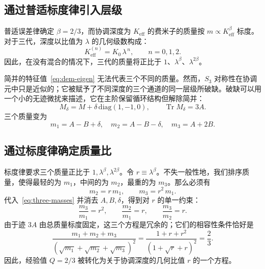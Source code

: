 \documentclass[11pt,a4paper]{article}
\theoremstyle{remark}
\begin{document}
	\subsection{通过普适标度律引入层级}
	
	普适误差律确定 \(\beta = 2/3\)，而协调深度为 \(K_{\mathrm{eff}}\) 的费米子的质量按 \(m \propto K_{\mathrm{eff}}^{\beta}\) 标度。对于三代，深度以比值为 \(\lambda\) 的几何级数构成：
	\[
	K_{\mathrm{eff}}^{(n)} = K_0 \, \lambda^{\,n}, \qquad n = 0,1,2 .
	\]
	因此，在没有混合的情况下，三代的质量将正比于 \(1\)、\(\lambda^{\beta}\)、\(\lambda^{2\beta}\)。
	
	简并的特征值~\eqref{eq:dem-eigen} 无法代表三个不同的质量。然而，\(S_3\) 对称性在协调元中只是近似的；它被赋予了不同深度的三个通道的同一层级所破缺。破缺可以用一个小的无迹微扰来描述，它在主阶保留循环结构但解除简并：
	\begin{equation}
		M_\delta = M + \delta \,\mathrm{diag}(1,-1,0), \qquad \operatorname{Tr} M_\delta = 3A .
	\end{equation}
	三个质量变为
	\begin{equation}
		m_1 = A - B + \delta, \quad
		m_2 = A - B - \delta, \quad
		m_3 = A + 2B .
		\label{eq:three-masses}
	\end{equation}
	
	\subsection{通过标度律确定质量比}
	
	标度律要求三个质量正比于 \(1, \lambda^{\beta}, \lambda^{2\beta}\)。令 \(r \equiv \lambda^{\beta}\)。不失一般性地，我们排序质量，使得最轻的为 \(m_1\)，中间的为 \(m_2\)，最重的为 \(m_3\)。那么必须有
	\begin{equation}
		m_2 = r\, m_1, \qquad m_3 = r^2\, m_1 .
	\end{equation}
	代入~\eqref{eq:three-masses} 并消去 \(A,B,\delta\)，得到对 \(r\) 的单一约束：
	\begin{equation}
		\frac{m_3}{m_1} = r^2, \qquad
		\frac{m_2}{m_1} = r, \qquad
		\frac{m_3}{m_2} = r .
	\end{equation}
	由于迹 \(3A\) 由总质量标度固定，这三个方程是冗余的；它们的相容性条件恰好是
	\begin{equation}
		\frac{m_1 + m_2 + m_3}{(\sqrt{m_1}+\sqrt{m_2}+\sqrt{m_3})^2}
		= \frac{1 + r + r^2}{(1 + \sqrt{r} + r)^2} = \frac{2}{3}.
		\label{eq:Qr}
	\end{equation}
	因此，经验值 \(Q=2/3\) 被转化为关于协调深度的几何比值 \(r\) 的一个方程。
	
\end{document}
